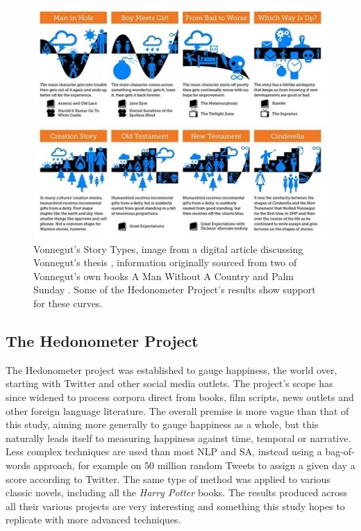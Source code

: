 \documentclass{article}
\begin{document}
        \begin{figure}
            \centering
            \includegraphics{Figures/Misc/VonnegutShapes}
            \caption{Vonnegut's Story Types, image from a digital article discussing Vonnegut's thesis \citep{vonnegutThesis}, information originally sourced from two of Vonnegut's own books \textup{A Man Without A Country} \citep{vonnegut_simon_2007} and \textup{Palm Sunday} \citep{vonnegut_1981}. Some of the Hedonometer Project's results show support for these curves.}
            \label{fig:storyTypes}
        \end{figure}
        
    \subsection{The Hedonometer Project}
    \label{subsec:hedonometer}
        The Hedonometer project was established to gauge happiness, the world over, starting with Twitter and other social media outlets. The project’s scope has since widened to process corpora direct from books, film scripts, news outlets and other foreign language literature. The overall premise is more vague than that of this study, aiming more generally to gauge happiness as a whole, but this naturally leads itself to measuring happiness against time, temporal or narrative. 
        Less complex techniques are used than most NLP and SA, instead using a bag-of-words approach, for example on 50 million random Tweets to assign a given day a score according to Twitter. The same type of method was applied to various classic novels, including all the \textit{Harry Potter} books. The results produced across all their various projects are very interesting and something this study hopes to replicate with more advanced techniques.
\newpage
\end{document}
